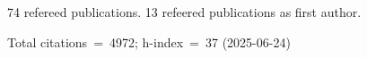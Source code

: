 74 refereed publications. 13 refeered publications as first author.

Total citations~=~4972; h-index~=~37 (2025-06-24)